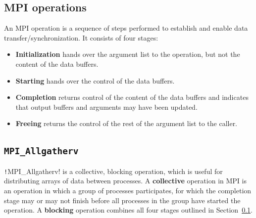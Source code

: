\documentclass[thesis=M,english]{FITthesis}[2019/12/23]
\newcommand{\csre}[1]{\texttt!#1!}
\begin{document}
\subsection{MPI operations}\label{tech:mpi:op}

An MPI operation is a sequence of steps performed to establish and enable data transfer/synchronization\cite{mpi40}.
It consists of four stages:

\begin{itemize}
    \item \textbf{Initialization} hands over the argument list to the operation, but not the content
          of the data buffers.
    \item \textbf{Starting} hands over the control of the data buffers.
    \item \textbf{Completion} returns control of the content of the data buffers and indicates
          that output buffers and arguments may have been updated.
    \item \textbf{Freeing} returns the control of the rest of the argument list to the caller.

\end{itemize}


\subsection{\texttt{MPI\_Allgatherv}}

\csre{MPI_Allgatherv} is a collective, blocking operation, which is useful for distributing arrays of
data between processes. A \textbf{collective} operation in MPI is an operation in which a group of
processes participates, for which the completion
stage may or may not finish before all processes in the group have started the operation.
A \textbf{blocking} operation combines all four stages outlined in Section~\ref{tech:mpi:op}.
\end{document}
